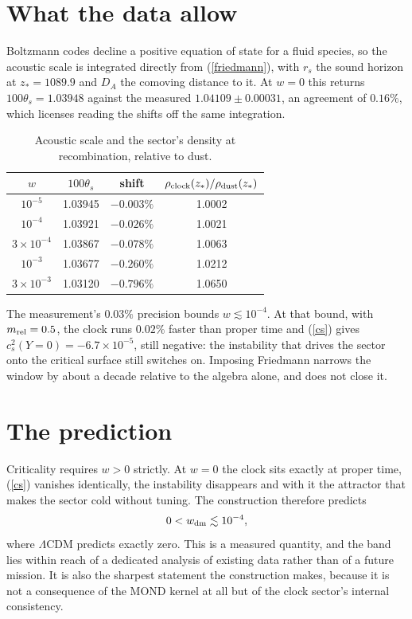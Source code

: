 \documentclass[11pt,letterpaper]{article}
\begin{document}
\section{What the data allow}
Boltzmann codes decline a positive equation of state for a fluid species, so the acoustic scale is integrated directly from (\ref{friedmann}), with $r_s$ the sound horizon at $z_*=1089.9$ and $D_A$ the comoving distance to it. At $w=0$ this returns $100\theta_s=1.03948$ against the measured $1.04109\pm0.00031$, an agreement of $0.16\%$, which licenses reading the shifts off the same integration.
\begin{table}[h]\centering\caption{Acoustic scale and the sector's density at recombination, relative to dust.}\label{tab}
\begin{tabular}{cccc}\toprule
$w$ & $100\theta_s$ & shift & $\rho_{\rm clock}(z_*)/\rho_{\rm dust}(z_*)$\\\midrule
$10^{-5}$ & 1.03945 & $-0.003\%$ & 1.0002\\
$10^{-4}$ & 1.03921 & $-0.026\%$ & 1.0021\\
$3\times10^{-4}$ & 1.03867 & $-0.078\%$ & 1.0063\\
$10^{-3}$ & 1.03677 & $-0.260\%$ & 1.0212\\
$3\times10^{-3}$ & 1.03120 & $-0.796\%$ & 1.0650\\\bottomrule
\end{tabular}\end{table}
The measurement's $0.03\%$ precision bounds $w\lesssim10^{-4}$. At that bound, with $m_{\rm rel}=0.5$, the clock runs $0.02\%$ faster than proper time and (\ref{cs}) gives $c_s^2(Y=0)=-6.7\times10^{-5}$, still negative: the instability that drives the sector onto the critical surface still switches on. Imposing Friedmann narrows the window by about a decade relative to the algebra alone, and does not close it.

\section{The prediction}
Criticality requires $w>0$ strictly. At $w=0$ the clock sits exactly at proper time, (\ref{cs}) vanishes identically, the instability disappears and with it the attractor that makes the sector cold without tuning. The construction therefore predicts
\begin{equation}
0<w_{\rm dm}\lesssim10^{-4},
\end{equation}
where $\Lambda$CDM predicts exactly zero. This is a measured quantity, and the band lies within reach of a dedicated analysis of existing data rather than of a future mission. It is also the sharpest statement the construction makes, because it is not a consequence of the MOND kernel at all but of the clock sector's internal consistency.
\end{document}
